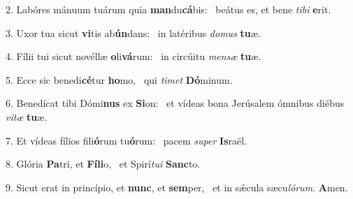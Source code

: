 2. Labóres mánuum tuárum quia \textbf{man}du\textbf{cá}bis: \ast\  beátus es, et bene \textit{ti}\textit{bi} \textbf{e}rit.\

3. Uxor tua sicut \textbf{vi}tis ab\textbf{ún}dans: \ast\  in latéribus \textit{do}\textit{mus} \textbf{tu}æ.\

4. Fílii tui sicut novéllæ \textbf{o}li\textbf{vá}rum: \ast\  in circúitu \textit{men}\textit{sæ} \textbf{tu}æ.\

5. Ecce sic benedi\textbf{cé}tur \textbf{ho}mo, \ast\  qui \textit{ti}\textit{met} \textbf{Dó}minum.\

6. Benedícat tibi Dómi\textbf{nus} ex \textbf{Si}on: \ast\  et vídeas bona Jerúsalem ómnibus diébus \textit{vi}\textit{tæ} \textbf{tu}æ.\

7. Et vídeas fílios fili\textbf{ó}rum tu\textbf{ó}rum: \ast\  pacem \textit{su}\textit{per} \textbf{Is}raël.\

8. Glória \textbf{Pa}tri, et \textbf{Fí}\textbf{li}o, \ast\  et Spirí\textit{tu}\textit{i} \textbf{Sanc}to.\

9. Sicut erat in princípio, et \textbf{nunc}, et \textbf{sem}per, \ast\  et in sǽcula sæcu\textit{ló}\textit{rum}. \textbf{A}men.\

